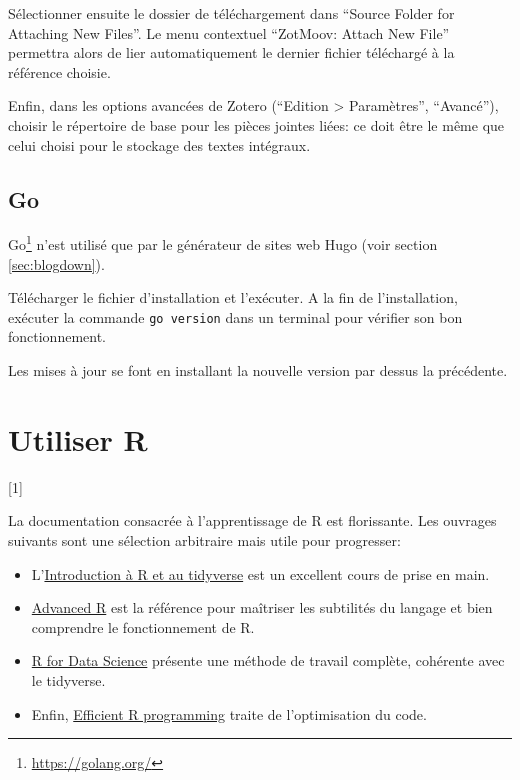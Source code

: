 \documentclass[
  12pt,
  french,
  a4paper,
  extrafontsizes,onecolumn,openright
  ]{memoir}
\providecommand{\tightlist}{%
  \setlength{\itemsep}{0pt}\setlength{\parskip}{0pt}}
\newcommand{\toc}[1]{%
  \startcontents[chapters]%
  \printcontents[chapters]{}{1}[#1]{}%
  ~\newline%
}
\begin{document}
Sélectionner ensuite le dossier de téléchargement dans \enquote{Source Folder for Attaching New Files}.
Le menu contextuel \enquote{ZotMoov: Attach New File} permettra alors de lier automatiquement le dernier fichier téléchargé à la référence choisie.

Enfin, dans les options avancées de Zotero (\enquote{Edition \textgreater{} Paramètres}, \enquote{Avancé}), choisir le répertoire de base pour les pièces jointes liées: ce doit être le même que celui choisi pour le stockage des textes intégraux.

\section{Go}\label{go}

Go\footnote{\url{https://golang.org/}} n'est utilisé que par le générateur de sites web Hugo (voir section \ref{sec:blogdown}).

Télécharger le fichier d'installation et l'exécuter.
A la fin de l'installation, exécuter la commande \texttt{go\ version} dans un terminal pour vérifier son bon fonctionnement.

Les mises à jour se font en installant la nouvelle version par dessus la précédente.

\chapter{Utiliser R}\label{chap-utiliseR}

\toc{1}

La documentation consacrée à l'apprentissage de R est florissante.
Les ouvrages suivants sont une sélection arbitraire mais utile pour progresser:

\begin{itemize}
\tightlist
\item
  L'\href{https://juba.github.io/tidyverse/}{Introduction à R et au tidyverse} \autocite{Barnier2020} est un excellent cours de prise en main.
\item
  \href{http://adv-r.had.co.nz/}{Advanced R} \autocite{Wickham2014} est la référence pour maîtriser les subtilités du langage et bien comprendre le fonctionnement de R.
\item
  \href{https://r4ds.had.co.nz/}{R for Data Science} \autocite{Wickham2016} présente une méthode de travail complète, cohérente avec le tidyverse.
\item
  Enfin, \href{https://csgillespie.github.io/efficientR/}{Efficient R programming} \autocite{Gillespie2016} traite de l'optimisation du code.
\end{itemize}
\end{document}
